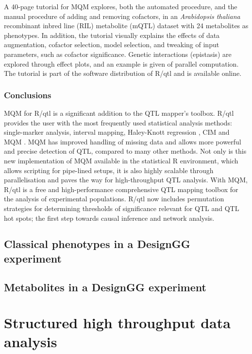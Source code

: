 \documentclass[8pt, twoside, a5paper]{report}
\begin{document}
A 40-page tutorial for MQM explores, both the automated procedure, and the manual procedure of adding and removing 
cofactors, in an \emph{Arabidopsis thaliana} recombinant inbred line (RIL) metabolite (mQTL) dataset with 24 metabolites 
as phenotypes\cite{Fu:2007}. In addition, the tutorial visually explains the effects of data augmentation, cofactor 
selection, model selection, and tweaking of input parameters, such as cofactor significance. Genetic interactions 
(epistasis) are explored through effect plots, and an example is given of parallel computation. The tutorial is part 
of the software distribution of R/qtl and is available online.

\subsection{Conclusions}
MQM for R/qtl is a significant addition to the QTL mapper's toolbox. R/qtl provides the user with the most frequently 
used statistical analysis methods: single-marker analysis, interval mapping, Haley-Knott regression \cite{Haley:1992}, 
CIM \cite{Zeng:1994} and MQM \cite{Jansen:1994a}.  MQM has improved handling of missing data and allows more powerful 
and precise detection of QTL, compared to many other methods. Not only is this new implementation of MQM available in the
statistical R environment, which allows scripting for pipe-lined setups, it is also highly scalable through 
parallelisation and paves the way for high-throughput QTL analysis. With MQM, R/qtl is a free and high-performance 
comprehensive QTL mapping toolbox for the analysis of experimental populations. R/qtl now includes permutation strategies 
for determining thresholds of significance relevant for QTL and QTL hot spots; the first step towards causal inference and
network analysis.

\section{Classical phenotypes in a DesignGG experiment}
\lipsum

\section{Metabolites in a DesignGG experiment}
\lipsum

\chapter{Structured high throughput data analysis}
\end{document}
